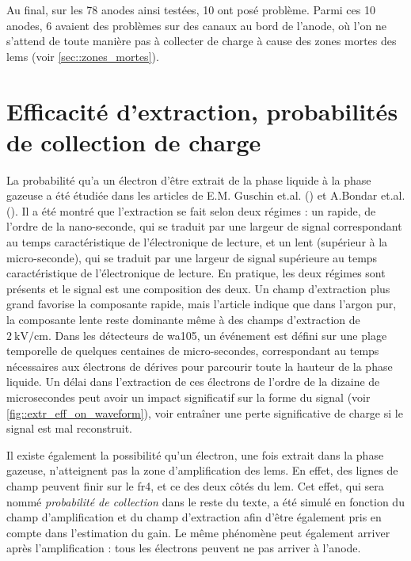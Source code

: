             Au final, sur les 78 anodes ainsi testées, 10 ont posé problème. Parmi ces 10 anodes, 6 avaient des problèmes sur des canaux au bord de l'anode, où l'on ne s'attend de toute manière pas à collecter de charge à cause des zones mortes des \glspl{lem} (voir \autoref{sec::zones_mortes}).
                        
    \section{Efficacité d'extraction, probabilités de collection de charge}\label{sec::efficacites}
    
        La probabilité qu'a un électron d'être extrait de la phase liquide à la phase gazeuse a été étudiée dans les articles de E.M. Guschin et.al. (\cite{guschin}) et A.Bondar et.al. (\cite{Bondar2009}). Il a été montré que l'extraction se fait selon deux régimes : un rapide, de l'ordre de la nano-seconde, qui se traduit par une largeur de signal correspondant au temps caractéristique de l'électronique de lecture, et un lent (supérieur à la micro-seconde), qui se traduit par une largeur de signal supérieure au temps caractéristique de l'électronique de lecture. En pratique, les deux régimes sont présents et le signal est une composition des deux. Un champ d'extraction plus grand favorise la composante rapide, mais l'article \cite{Bondar2009} indique que dans l'argon pur, la composante lente reste dominante même à des champs d'extraction de $\SI{2}{\kilo\volt\per\centi\meter}$. Dans les détecteurs de \gls{wa105}, un événement est défini sur une plage temporelle de quelques centaines de micro-secondes, correspondant au temps nécessaires aux électrons de dérives pour parcourir toute la hauteur de la phase liquide. Un délai dans l'extraction de ces électrons de l'ordre de la dizaine de microsecondes peut avoir un impact significatif sur la forme du signal (voir \autoref{fig::extr_eff_on_waveform}), voir entraîner une perte significative de charge si le signal est mal reconstruit.
        
        Il existe également la possibilité qu'un électron, une fois extrait dans la phase gazeuse, n'atteignent pas la zone d'amplification des \glspl{lem}. En effet, des lignes de champ peuvent finir sur le \gls{fr4}, et ce des deux côtés du \gls{lem}. Cet effet, qui sera nommé \textit{probabilité de collection} dans le reste du texte, a été simulé en fonction du champ d'amplification et du champ d'extraction afin d'être également pris en compte dans l'estimation du gain. Le même phénomène peut également arriver après l'amplification : tous les électrons peuvent ne pas arriver à l'anode.
        
